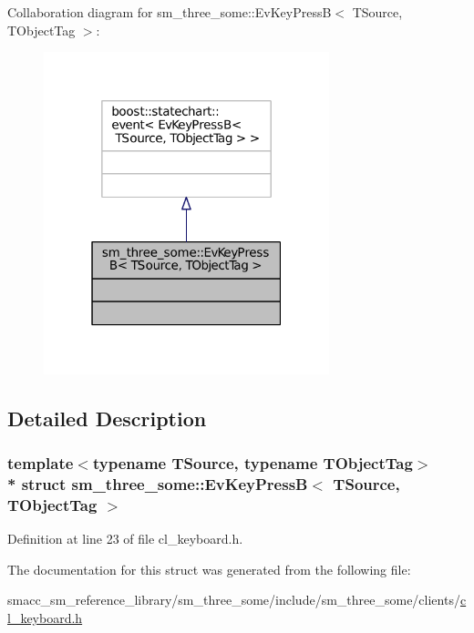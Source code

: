Collaboration diagram for sm\+\_\+three\+\_\+some\+:\+:Ev\+Key\+PressB$<$ T\+Source, T\+Object\+Tag $>$\+:
\nopagebreak
\begin{figure}[H]
\begin{center}
\leavevmode
\includegraphics[width=235pt]{structsm__three__some_1_1EvKeyPressB__coll__graph}
\end{center}
\end{figure}


\subsection{Detailed Description}
\subsubsection*{template$<$typename T\+Source, typename T\+Object\+Tag$>$\\*
struct sm\+\_\+three\+\_\+some\+::\+Ev\+Key\+Press\+B$<$ T\+Source, T\+Object\+Tag $>$}



Definition at line 23 of file cl\+\_\+keyboard.\+h.



The documentation for this struct was generated from the following file\+:\begin{DoxyCompactItemize}
\item 
smacc\+\_\+sm\+\_\+reference\+\_\+library/sm\+\_\+three\+\_\+some/include/sm\+\_\+three\+\_\+some/clients/\hyperlink{cl__keyboard_8h}{cl\+\_\+keyboard.\+h}\end{DoxyCompactItemize}

